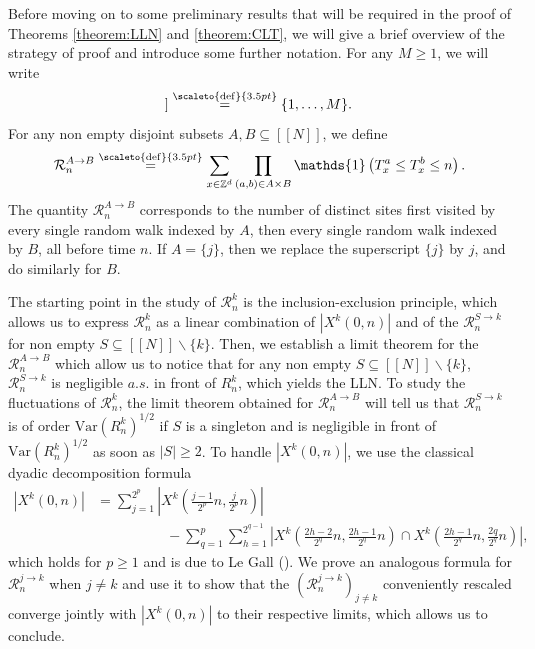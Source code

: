 \documentclass[12pt]{article}
\newcommand{\R}{\mathcal R}
\newcommand{\1}{\mathds{1}}
\newcommand{\ZZ}{\mathbb Z}
\newcommand{\Var}{\mathrm{Var}}
\newcommand{\eqdef}{\stackrel{\scaleto{\mathrm{def}}{3.5pt}}{=}}
\numberwithin{equation}{section}
\begin{document}
Before moving on to some preliminary results that will be required in the proof of Theorems \ref{theorem:LLN} and \ref{theorem:CLT}, we will give a brief overview of the strategy of proof and introduce some further notation. For any $M\ge1$, we will write
\begin{equation*}
    [\![M]\!]\eqdef\{1,\dots,M\}.
\end{equation*}
For any non empty disjoint subsets $A,B\subseteq[\![N]\!]$, we define
\begin{equation*}
    \R_n^{A\rightarrow B}\eqdef\sum_{x\in\ZZ^d}\prod_{(a,b)\in A\times B}\1\left(T_x^a\le T_x^b\le n\right).
\end{equation*}
The quantity $\mathcal R_n^{A\rightarrow B}$ corresponds to the number of distinct sites first visited by every single random walk indexed by $A$, then every single random walk indexed by $B$, all before time $n$. If $A=\{j\}$, then we replace the superscript $\{j\}$ by $j$, and do similarly for $B$.

The starting point in the study of $\R_n^k$ is the inclusion-exclusion principle, which allows us to express $\R_n^k$ as a linear combination of $\left|X^k(0,n)\right|$ and of the $\R_n^{S\rightarrow k}$ for non empty $S\subseteq[\![N]\!]\backslash\{k\}$. Then, we establish a limit theorem for the $\R_n^{A\rightarrow B}$ which allow us to notice that for any non empty $S\subseteq[\![N]\!]\backslash\{k\}$, $\R_n^{S\rightarrow k}$ is negligible $a.s.$ in front of $R_n^k$, which yields the LLN. To study the fluctuations of $\R_n^k$, the limit theorem obtained for $\R_n^{A\rightarrow B}$ will tell us that $\R_n^{S\rightarrow k}$ is of order $\Var(R_n^k)^{1/2}$ if $S$ is a singleton and is negligible in front of $\Var(R_n^k)^{1/2}$ as soon as $|S|\ge2$. To handle $\left|X^k(0,n)\right|$, we use the classical dyadic decomposition formula
\begin{align}
    \label{eq:decomposition for the classic range}
    \left|X^k(0,n)\right|&=\sum_{j=1}^{2^p}\left|X^k\left(\frac{j-1}{2^p}n,\frac{j}{2^p}n\right)\right|\\
    &\hspace{5em}-\sum_{q=1}^p\sum_{h=1}^{2^{q-1}}\left|X^k\left(\frac{2h-2}{2^{q}}n,\frac{2h-1}{2^q}n\right)\cap X^k\left(\frac{2h-1}{2^q}n,\frac{2q}{2^q}n\right)\right|,\nonumber
\end{align}
which holds for $p\ge1$ and is due to Le Gall (\cite{LeGallIntersectionsMarchesAléatoires1986}). We prove an analogous formula for $\R_n^{j\rightarrow k}$ when $j\ne k$ and use it to show that the $\left(\R_n^{j\rightarrow k}\right)_{j\ne k}$ conveniently rescaled converge jointly with $\left|X^k(0,n)\right|$ to their respective limits, which allows us to conclude.
\end{document}
